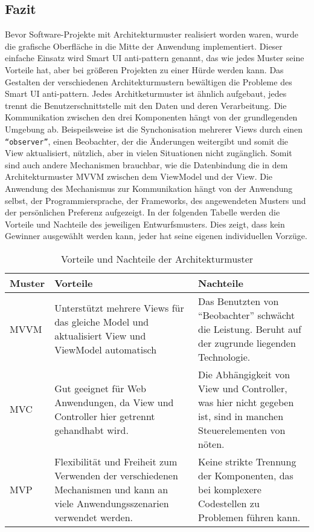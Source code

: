 \subsection{Fazit}
Bevor Software-Projekte mit Architekturmuster realisiert worden waren, wurde die grafische Oberfl\"ache in die Mitte der Anwendung implementiert. Dieser einfache Einsatz wird Smart \ac{UI} anti-pattern genannt, das wie jedes Muster seine Vorteile hat, aber bei gr\"o\ss{}eren Projekten zu einer H\"urde werden kann. Das Gestalten der verschiedenen Architekturmustern bew\"altigen die Probleme des Smart UI anti-pattern. Jedes Architketurmuster ist \"ahnlich aufgebaut, jedes trennt die Benutzerschnittstelle mit den Daten und deren Verarbeitung. Die Kommunikation zwischen den drei Komponenten h\"angt von der grundlegenden Umgebung ab. Beispeilsweise ist die Synchonisation mehrerer Views durch einen \texttt{\enquote{observer}}, einen Beobachter, der die \"Anderungen weitergibt und somit die View aktualisiert, n\"utzlich, aber in vielen Situationen nicht zug\"anglich. Somit sind auch andere Mechanismen brauchbar, wie die Datenbindung die in dem Architekturmuster \ac{MVVM} zwischen dem ViewModel und der View. Die Anwendung des Mechanismus zur Kommunikation h\"angt von der Anwendung selbst, der Programmiersprache, der Frameworks, des angewendeten Musters und der pers\"onlichen Preferenz aufgezeigt\cite{Bragge2013}. In der folgenden Tabelle\cite{Syromiatnikov2014} werden die Vorteile und Nachteile des jeweiligen Entwurfsmusters. Dies zeigt, dass kein Gewinner ausgew\"ahlt werden kann, jeder hat seine eigenen individuellen Vorz\"uge.
\begin{table}[h]
\centering
\caption{Vorteile und Nachteile der Architekturmuster}
\label{ProConsPattern}
\begin{tabular}{p{2cm}p{7cm}p{7cm}}
\toprule
Muster & Vorteile & Nachteile \\ \midrule
\ac{MVVM}              
& Unterst\"utzt mehrere Views f\"ur das gleiche Model und aktualisiert View und ViewModel automatisch
& 
Das Benutzten von \enquote{Beobachter} schw\"acht die Leistung. Beruht auf der zugrunde liegenden Technologie.  \\ \hline
\ac{MVC}     
 & 
Gut geeignet f\"ur Web Anwendungen, da View und Controller hier getrennt gehandhabt wird.
 &
 Die Abh\"angigkeit von View und Controller, was hier nicht gegeben ist, sind in manchen Steuerelementen von n\"oten.  \\ \hline
\ac{MVP}            
&
Flexibilit\"at und Freiheit zum Verwenden der verschiedenen Mechanismen und kann an viele Anwendungsszenarien verwendet werden. 
&
Keine strikte Trennung der Komponenten, das bei komplexere Codestellen zu Problemen f\"uhren kann.  
\\ \bottomrule
\end{tabular}
\end{table}
